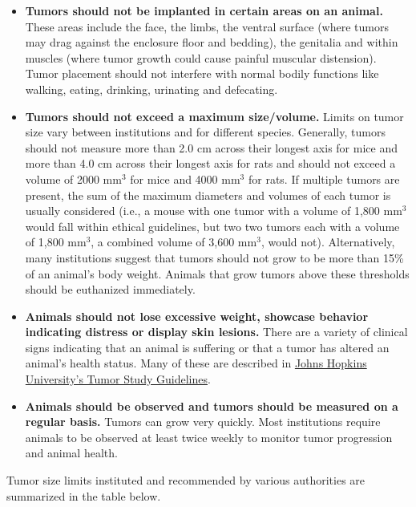 \documentclass[letterpaper, 12pt]{article}
\begin{document}
\begin{itemize}
    \setlength\itemsep{-0.5em}
    \item \textbf{Tumors should not be implanted in certain areas on an animal.} These areas include the face, the limbs, the ventral surface (where tumors may drag against the enclosure floor and bedding), the genitalia and within muscles (where tumor growth could cause painful muscular distension). Tumor placement should not interfere with normal bodily functions like walking, eating, drinking, urinating and defecating.
    \item \textbf{Tumors should not exceed a maximum size/volume.} Limits on tumor size vary between institutions and for different species. Generally, tumors should not measure more than 2.0 cm across their longest axis for mice and more than 4.0 cm across their longest axis for rats and should not exceed a volume of 2000 mm$^3$ for mice and 4000 mm$^3$ for rats. If multiple tumors are present, the sum of the maximum diameters and volumes of each tumor is usually considered (i.e., a mouse with one tumor with a volume of 1,800 mm$^3$ would fall within ethical guidelines, but two two tumors each with a volume of 1,800 mm$^3$, a combined volume of 3,600 mm$^3$, would not). Alternatively, many institutions suggest that tumors should not grow to be more than 15\% of an animal's body weight. Animals that grow tumors above these thresholds should be euthanized immediately.
    \item \textbf{Animals should not lose excessive weight, showcase behavior indicating distress or display skin lesions.} There are a variety of clinical signs indicating that an animal is suffering or that a tumor has altered an animal's health status. Many of these are described in \href{https://animalcare.jhu.edu/wp-content/uploads/sites/5/Tumor-Study-Guidelines-in-Mice-and-Rats.pdf}{Johns Hopkins University's Tumor Study Guidelines}.
    \item \textbf{Animals should be observed and tumors should be measured on a regular basis.} Tumors can grow very quickly. Most institutions require animals to be observed at least twice weekly to monitor tumor progression and animal health.
\end{itemize}

Tumor size limits instituted and recommended by various authorities are summarized in the table below.
\end{document}
